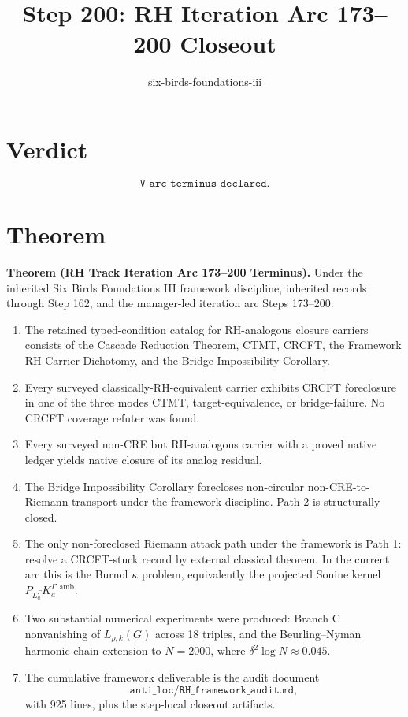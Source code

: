 \documentclass[11pt]{article}
\title{Step 200: RH Iteration Arc 173--200 Closeout}
\author{six-birds-foundations-iii}
\date{}
\begin{document}
\maketitle

\section*{Verdict}

\[
\boxed{\texttt{V\_arc\_terminus\_declared}.}
\]

\section*{Theorem}

\textbf{Theorem (RH Track Iteration Arc 173--200 Terminus).}
Under the inherited Six Birds Foundations III framework discipline, inherited
records through Step 162, and the manager-led iteration arc Steps 173--200:

\begin{enumerate}
\item The retained typed-condition catalog for RH-analogous closure carriers
consists of the Cascade Reduction Theorem, CTMT, CRCFT, the Framework
RH-Carrier Dichotomy, and the Bridge Impossibility Corollary.

\item Every surveyed classically-RH-equivalent carrier exhibits CRCFT
foreclosure in one of the three modes CTMT, target-equivalence, or
bridge-failure.  No CRCFT coverage refuter was found.

\item Every surveyed non-CRE but RH-analogous carrier with a proved native
ledger yields native closure of its analog residual.

\item The Bridge Impossibility Corollary forecloses non-circular
non-CRE-to-Riemann transport under the framework discipline.  Path 2 is
structurally closed.

\item The only non-foreclosed Riemann attack path under the framework is Path
1: resolve a CRCFT-stuck record by external classical theorem.  In the current
arc this is the Burnol \(\kappa\) problem, equivalently the projected Sonine
kernel \(P_{L_a^\Gamma}K_a^{\Gamma,\mathrm{amb}}\).

\item Two substantial numerical experiments were produced: Branch C
nonvanishing of \(L_{\rho,k}(G)\) across 18 triples, and the
Beurling--Nyman harmonic-chain extension to \(N=2000\), where
\(\delta^2\log N\approx0.045\).

\item The cumulative framework deliverable is the audit document
\[
\texttt{anti\_loc/RH\_framework\_audit.md},
\]
with 925 lines, plus the step-local closeout artifacts.
\end{enumerate}
\end{document}
